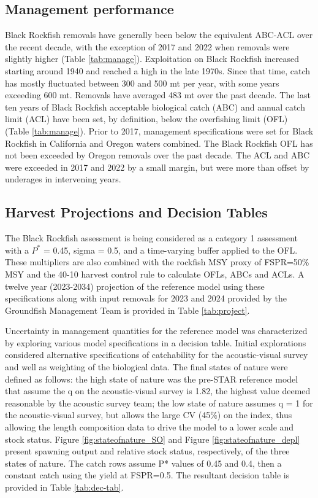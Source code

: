 \documentclass[11pt,
  english,
  letterpaper,
]{article}
\begin{document}
\hypertarget{management-performance-1}{%
\subsection{Management performance}\label{management-performance-1}}

Black Rockfish removals have generally been below the equivalent ABC-ACL over the recent decade, with the exception of 2017 and 2022 when removals were slightly higher (Table \ref{tab:manage}). Exploitation on Black Rockfish increased starting around 1940 and reached a high in the late 1970s. Since that time, catch has mostly fluctuated between 300 and 500 mt per year, with some years exceeding 600 mt. Removals have averaged 483 mt over the past decade. The last ten years of Black Rockfish acceptable biological catch (ABC) and annual catch limit (ACL) have been set, by definition, below the overfishing limit (OFL) (Table \ref{tab:manage}). Prior to 2017, management specifications were set for Black Rockfish in California and Oregon waters combined. The Black Rockfish OFL has not been exceeded by Oregon removals over the past decade. The ACL and ABC were exceeded in 2017 and 2022 by a small margin, but were more than offset by underages in intervening years.

\hypertarget{harvest-projections-and-decision-tables}{%
\subsection{Harvest Projections and Decision Tables}\label{harvest-projections-and-decision-tables}}

The Black Rockfish assessment is being considered as a category 1 assessment with a \(P^*\) = 0.45, sigma = 0.5, and a time-varying buffer applied to the OFL. These multipliers are also combined with the rockfish MSY proxy of FSPR=50\% MSY and the 40-10 harvest control rule to calculate OFLs, ABCs and ACLs. A twelve year (2023-2034) projection of the reference model using these specifications along with input removals for 2023 and 2024 provided by the Groundfish Management Team is provided in Table \ref{tab:project}.

Uncertainty in management quantities for the reference model was characterized by exploring various model specifications in a decision table. Initial explorations considered alternative specifications of catchability for the acoustic-visual survey and well as weighting of the biological data. The final states of nature were defined as follows: the high state of nature was the pre-STAR reference model that assume the q on the acoustic-visual survey is 1.82, the highest value deemed reasonable by the acoustic survey team; the low state of nature assumes q = 1 for the acoustic-visual survey, but allows the large CV (45\%) on the index, thus allowing the length composition data to drive the model to a lower scale and stock status. Figure \ref{fig:stateofnature_SO} and Figure \ref{fig:stateofnature_depl} present spawning output and relative stock status, respectively, of the three states of nature. The catch rows assume P* values of 0.45 and 0.4, then a constant catch using the yield at FSPR=0.5. The resultant decision table is provided in Table \ref{tab:dec-tab}.
\end{document}
